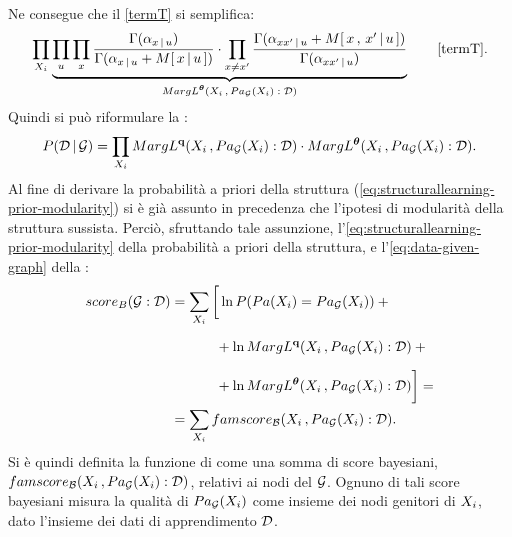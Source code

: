 Ne consegue che il \autoref{termT} si semplifica:
\[
\prod_{\setel{X}_i} \underbrace{\prod_{\setel{u}} \prod_{\setel{x}} \frac{\Gamma(\alpha_{\setel{x}\,\arrowvert\,\setel{u}})}{\Gamma(\alpha_{\setel{x}\,\arrowvert\,\setel{u}}+\mstat{x\,\arrowvert\,\setel{u}})} \cdot \prod_{\setel{x}\neq\setel{x}^\prime} \frac{\Gamma(\alpha_{\setel{x}\setel{x}^\prime\,\arrowvert\,\setel{u}}+\mstat[x]{\setel{x}^\prime\,\arrowvert\,\setel{u}})}{\Gamma(\alpha_{\setel{x}\setel{x}^\prime\,\arrowvert\,\setel{u}})}}_\text{$MargL^{\param{$\theta$}}(\setel{X}_i\,,Pa_{\conceptsym{G}}(\setel{X}_i):\conceptsym{D})$} \tag*{\ref{termT}} \text{.}
\]
Quindi si può riformulare la :
\begin{equation}\label{eq:data-given-graph}
P(\mathcal{D}\,\arrowvert\,\mathcal{G}) = \prod_{\mathnormal{X}_i} MargL^{\boldsymbol{\textbf{\text{q}}}}(\mathnormal{X}_i\,,Pa_{\mathcal{G}}(\mathnormal{X}_i):\mathcal{D}) \cdot MargL^{\boldsymbol{\textbf{\text{$\theta$}}}}(\mathnormal{X}_i\,,Pa_{\mathcal{G}}(\mathnormal{X}_i):\mathcal{D}) \text{.}
\end{equation}
Al fine di derivare la probabilità a priori della struttura (\autoref{eq:structurallearning-prior-modularity}) si è già assunto in precedenza che l'ipotesi di modularità della struttura sussista. Perciò, sfruttando tale assunzione, l'\autoref{eq:structurallearning-prior-modularity} della probabilità a priori della struttura, e l'\autoref{eq:data-given-graph} della :
\begin{align}\label{eq:bayesian-score}
score_B(\mathcal{G}:\mathcal{D}) &= \sum_{\mathnormal{X}_i} \bigg[ \ln{P(Pa(\mathnormal{X}_i)=Pa_{\mathcal{G}}(\mathnormal{X}_i))} + \bigg.\nonumber\\
& \qquad \quad \> \bigg.{} + \ln{MargL^{\boldsymbol{\textbf{\text{q}}}}(\mathnormal{X}_i\,,Pa_{\mathcal{G}}(\mathnormal{X}_i):\mathcal{D})} + \bigg.\nonumber\\
& \qquad \quad \> \bigg.{} + \ln{MargL^{\boldsymbol{\textbf{\text{$\theta$}}}}(\mathnormal{X}_i\,,Pa_{\mathcal{G}}(\mathnormal{X}_i):\mathcal{D})} \bigg] = \nonumber\\
&= \sum_{\mathnormal{X}_i} famscore_{\mathcal{B}}(\mathnormal{X}_i\,,Pa_{\mathcal{G}}(\mathnormal{X}_i):\mathcal{D}) \text{.}
\end{align}
Si è quindi definita la funzione di  come una somma di score bayesiani, $famscore_{\mathcal{B}}(\mathnormal{X}_i\,,Pa_{\mathcal{G}}(\mathnormal{X}_i):\mathcal{D})$, relativi ai nodi del  $\mathcal{G}$. Ognuno di tali score bayesiani misura la qualità di $Pa_{\mathcal{G}}(\mathnormal{X}_i)$ come insieme dei nodi genitori di $\mathnormal{X}_i$, dato l'insieme dei dati di apprendimento $\mathcal{D}$.

